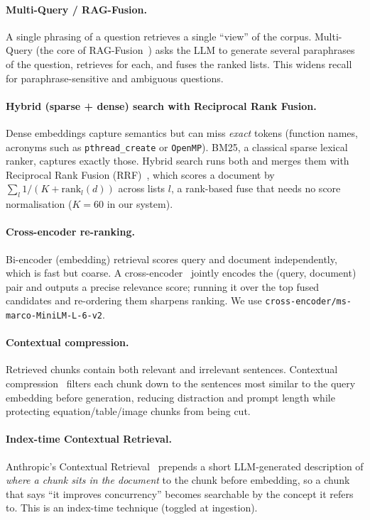 \documentclass[12pt,a4paper]{report}
\begin{document}
\paragraph{Multi-Query / RAG-Fusion.}
A single phrasing of a question retrieves a single ``view'' of the corpus.
Multi-Query (the core of RAG-Fusion~\cite{ragfusion}) asks the LLM to generate
several paraphrases of the question, retrieves for each, and fuses the ranked
lists. This widens recall for paraphrase-sensitive and ambiguous questions.

\paragraph{Hybrid (sparse + dense) search with Reciprocal Rank Fusion.}
Dense embeddings capture semantics but can miss \emph{exact} tokens (function
names, acronyms such as \texttt{pthread\_create} or \texttt{OpenMP}). BM25, a
classical sparse lexical ranker, captures exactly those. Hybrid search runs both
and merges them with Reciprocal Rank Fusion (RRF)~\cite{rrf}, which scores a
document by $\sum_{l} 1/(K + \text{rank}_l(d))$ across lists $l$, a rank-based fuse
that needs no score normalisation ($K=60$ in our system).

\paragraph{Cross-encoder re-ranking.}
Bi-encoder (embedding) retrieval scores query and document independently, which is
fast but coarse. A cross-encoder~\cite{sbert} jointly encodes the
(query, document) pair and outputs a precise relevance score; running it over the
top fused candidates and re-ordering them sharpens ranking. We use
\texttt{cross-encoder/ms-marco-MiniLM-L-6-v2}.

\paragraph{Contextual compression.}
Retrieved chunks contain both relevant and irrelevant sentences. Contextual
compression~\cite{langchain} filters each chunk down to the sentences most similar
to the query embedding before generation, reducing distraction and prompt length
while protecting equation/table/image chunks from being cut.

\paragraph{Index-time Contextual Retrieval.}
Anthropic's Contextual Retrieval~\cite{contextual} prepends a short LLM-generated
description of \emph{where a chunk sits in the document} to the chunk before
embedding, so a chunk that says ``it improves concurrency'' becomes searchable by
the concept it refers to. This is an index-time technique (toggled at ingestion).
\end{document}
